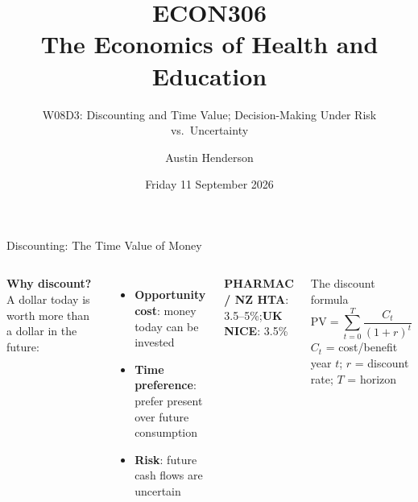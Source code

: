 \documentclass[aspectratio=169, 12pt]{beamer}
\title[ECON306: W08D3 — Discounting and Uncertainty]{ECON306\\The Economics of Health and Education}
\subtitle{W08D3: Discounting and Time Value; Decision-Making Under Risk vs.\ Uncertainty}
\author{Austin Henderson}
\institute{Department of Economics\\University of Otago}
\date{Friday 11 September 2026}
\begin{document}
\begin{frame}[plain]
  \titlepage
\end{frame}



\begin{frame}{Discounting: The Time Value of Money}
  \begin{columns}
      \small
      \textbf{Why discount?} A dollar today is worth more than a dollar in the future:
      \begin{itemize}
        \item \textbf{Opportunity cost}: money today can be invested
        \item \textbf{Time preference}: prefer present over future consumption
        \item \textbf{Risk}: future cash flows are uncertain
      \end{itemize}
      \vspace{0.2em}
      \textbf{PHARMAC / NZ HTA}: 3.5--5\%;\quad \textbf{UK NICE}: 3.5\%
      \begin{block}{The discount formula}
        \[ \text{PV} = \sum_{t=0}^{T} \frac{C_t}{(1+r)^t} \]
        \small $C_t$ = cost/benefit year $t$; $r$ = discount rate; $T$ = horizon
      \end{block}
  \end{columns}
\end{frame}
\end{document}

